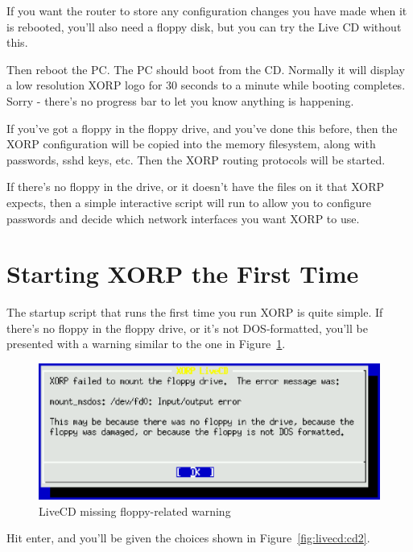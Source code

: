 If you want the router to store any configuration changes you have made
when it is rebooted, you'll also need a floppy disk, but you can try
the Live CD without this.

Then reboot the PC.  The PC should boot from the CD.  Normally it will
display a low resolution XORP logo for 30 seconds to a minute while
booting completes.  Sorry - there's no progress bar to let you know
anything is happening.

If you've got a floppy in the floppy drive, and you've done this
before, then the XORP configuration will be copied into the memory
filesystem, along with passwords, sshd keys, etc.  Then the XORP
routing protocols will be started.

If there's no floppy in the drive, or it doesn't have the files on it
that XORP expects, then a simple interactive script will run to allow
you to configure passwords and decide which network interfaces you
want XORP to use.


\section{Starting XORP the First Time}

The startup script that runs the first time you run XORP is quite
simple. If there's no floppy in the floppy drive, or it's not
DOS-formatted, you'll be presented with a warning similar to the one in
Figure~\ref{fig:livecd:cd1}.

\begin{figure}[h]
  \begin{center}
    \includegraphics[width=6.0in]{figs/cd1}
    \caption{LiveCD missing floppy-related warning}
    \label{fig:livecd:cd1}
  \end{center}
\end{figure}

Hit enter, and you'll be given the choices shown in
Figure~\ref{fig:livecd:cd2}.

